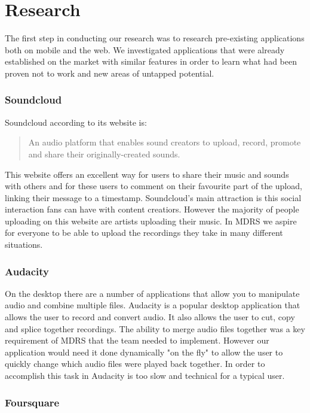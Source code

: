 \documentclass{l3proj}
\begin{document}
\chapter{Research}
\label{Research}

The first step in conducting our research was to research pre-existing applications both on mobile and the web. We investigated applications that were already established on the market with similar features in order to learn what had been proven not to work and new areas of untapped potential.

\subsection{Soundcloud}
Soundcloud\cite{soundcloud} according to its website is:
\blockquote{An audio platform that enables sound creators to upload, record, promote and share their originally-created sounds.}
This website offers an excellent way for users to share their music and sounds with others and for these users to comment on their favourite part of the upload, linking their message to a timestamp. Soundcloud's main attraction is this social interaction fans can have with content creatiors. However the majority of people uploading on this website are artists uploading their music. In MDRS we aspire for everyone to be able to upload the recordings they take in many different situations.

\subsection{Audacity}

On the desktop there are a number of applications that allow you to manipulate audio and combine multiple files. Audacity is a popular desktop application that allows the user to record and convert audio. It also allows the user to cut, copy and splice together recordings. The ability to merge audio files together was a key requirement of MDRS that the team needed to implement. However our application would need it done dynamically "on the fly" to allow the user to quickly change which audio files were played back together. In order to accomplish this task in Audacity\cite{audacity} is too slow and technical for a typical user.

\subsection{Foursquare}
\end{document}

